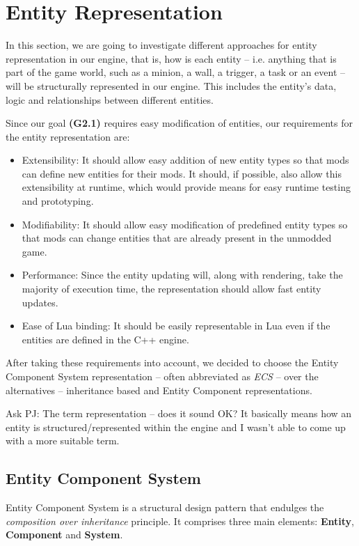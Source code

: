 \section{Entity Representation}

In this section, we are going to investigate different approaches for entity representation in our engine, that is, how is each
entity -- i.e. anything that is part of the game world, such as a minion, a wall, a trigger, a task or an event -- will be
structurally represented in our engine. This includes the entity's data, logic and relationships between different entities.

Since our goal \textbf{(G2.1)} requires easy modification of entities, our requirements for the entity representation are:
\begin{itemize}
    \item Extensibility: It should allow easy addition of new entity types so that mods can define new entities for their mods. It
        should, if possible, also allow this extensibility at runtime, which would provide means for easy runtime testing and prototyping.
    \item Modifiability: It should allow easy modification of predefined entity types so that mods can change entities that are already
        present in the unmodded game.
    \item Performance: Since the entity updating will, along with rendering, take the majority of execution time, the representation should
        allow fast entity updates.
    \item Ease of Lua binding: It should be easily representable in Lua even if the entities are defined in the C++ engine.
\end{itemize}

After taking these requirements into account, we decided to choose the Entity Component System representation
-- often abbreviated as \emph{ECS} -- over
the alternatives -- inheritance based and Entity Component representations.

\bigskip
Ask PJ: The term representation -- does it sound OK? It basically means how an entity is structured/represented within the engine
and I wasn't able to come up with a more suitable term.

\subsection{Entity Component System}

Entity Component System is a structural design pattern that endulges the \emph{composition over inheritance} principle.
It comprises three main elements: \textbf{Entity}, \textbf{Component} and \textbf{System}.

